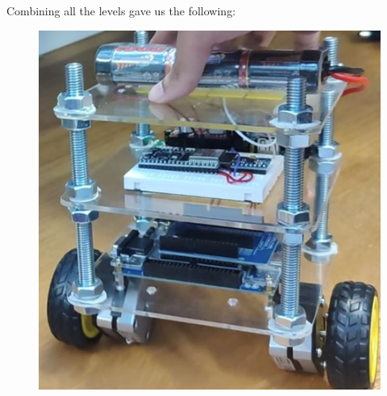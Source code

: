 Combining all the levels gave us the following:


\begin{figure}
    \centering
    \includegraphics[width=0.8\linewidth]{images/final-chassis.png}
    \caption{}
\end{figure}